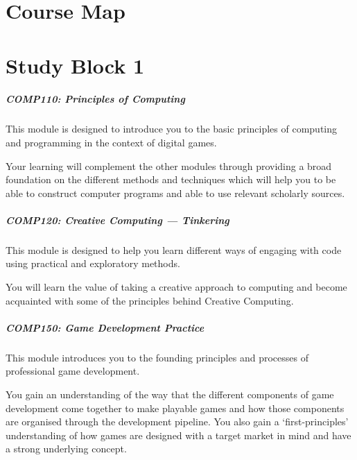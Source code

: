 \part{Course Map}
\frame{\partpage}




\part{Study Block 1}
\frame{\partpage}

\begin{frame}
	\frametitle{\Large{COMP110: Principles of Computing}}
	
	This module is designed to introduce you to the basic principles of computing and programming in the context of digital games.
	
	\vspace{2em}
	
	Your learning will complement the other modules through providing a broad foundation on the different methods and techniques which will help you to be able to construct computer programs and able to use relevant scholarly sources. 

\end{frame}

\begin{frame}
	\frametitle{\Large{COMP120: Creative Computing --- Tinkering}}
	
	This module is designed to help you learn different ways of engaging with code using practical and exploratory methods. 
	
	\vspace{2em}
	
	You will learn the value of taking a creative approach to computing and become acquainted with some of the principles behind Creative Computing. 

\end{frame}

\begin{frame}
	\frametitle{\Large{COMP150: Game Development Practice}}
	
	This module introduces you to the founding principles and processes of professional game development. 
	
	\vspace{2em}
	
	You gain an understanding of the way that the different components of game development come together to make playable games and how those components are organised through the development pipeline. You also gain a `first-principles' understanding of how games are designed with a target market in mind and have a strong underlying concept.

\end{frame}

